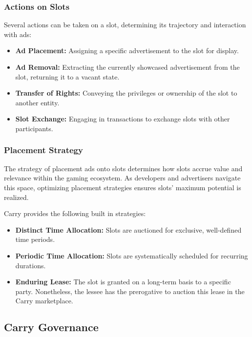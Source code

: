 \subsubsection{Actions on Slots}
Several actions can be taken on a slot, determining its trajectory and interaction with ads:

\begin{itemize}
    \item \textbf{Ad Placement:} Assigning a specific advertisement to the slot for display.
    
    \item \textbf{Ad Removal:} Extracting the currently showcased advertisement from the slot, returning it to a vacant state.
    
    \item \textbf{Transfer of Rights:} Conveying the privileges or ownership of the slot to another entity.
    
    \item \textbf{Slot Exchange:} Engaging in transactions to exchange slots with other participants.
\end{itemize}


\subsubsection{Placement Strategy}
The strategy of placement ads onto slots determines how slots accrue value and relevance within the gaming ecosystem. As developers and advertisers navigate this space, optimizing placement strategies ensures slots' maximum potential is realized. 

Carry provides the following built in strategies:
\begin{itemize}
    \item \textbf{Distinct Time Allocation:} Slots are auctioned for exclusive, well-defined time periods.
    
    \item \textbf{Periodic Time Allocation:} Slots are systematically scheduled for recurring durations.
    
    \item \textbf{Enduring Lease:} The slot is granted on a long-term basis to a specific party. Nonetheless, the lessee has the prerogative to auction this lease in the Carry marketplace.
\end{itemize}


\subsection{Carry Governance}

